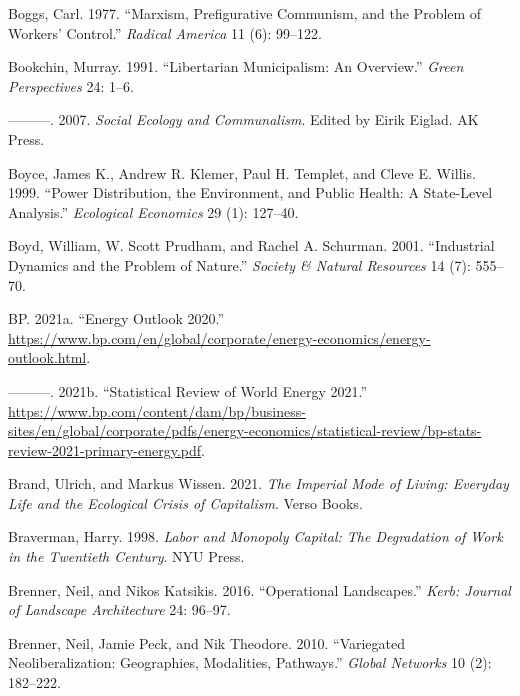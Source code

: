 \documentclass[a4paper, nobind]{templates/ociamthesis}
\newlength{\cslhangindent}
\newenvironment{CSLReferences}[2] %
 {%
  \setlength{\parindent}{0pt}
  \ifodd #1
  \let\oldpar\par
  \def\par{\hangindent=\cslhangindent\oldpar}
  \fi
  \setlength{\parskip}{1mm}
  \setlength{\baselineskip}{6mm}
 }%
 {}
\begin{document}
\begin{CSLReferences}{1}{0}
\leavevmode{}%
Boggs, Carl. 1977. {``Marxism, Prefigurative Communism, and the Problem of Workers' Control.''} \emph{Radical America} 11 (6): 99--122.

\leavevmode{}%
Bookchin, Murray. 1991. {``Libertarian Municipalism: {An} Overview.''} \emph{Green Perspectives} 24: 1--6.

\leavevmode{}%
---------. 2007. \emph{Social {Ecology} and {Communalism}}. Edited by Eirik Eiglad. {AK Press}.

\leavevmode{}%
Boyce, James K., Andrew R. Klemer, Paul H. Templet, and Cleve E. Willis. 1999. {``Power Distribution, the Environment, and Public Health: {A} State-Level Analysis.''} \emph{Ecological Economics} 29 (1): 127--40.

\leavevmode{}%
Boyd, William, W. Scott Prudham, and Rachel A. Schurman. 2001. {``Industrial Dynamics and the Problem of Nature.''} \emph{Society \& Natural Resources} 14 (7): 555--70.

\leavevmode{}%
BP. 2021a. {``Energy {Outlook} 2020.''} \url{https://www.bp.com/en/global/corporate/energy-economics/energy-outlook.html}.

\leavevmode{}%
---------. 2021b. {``Statistical {Review} of {World Energy} 2021.''} \url{https://www.bp.com/content/dam/bp/business-sites/en/global/corporate/pdfs/energy-economics/statistical-review/bp-stats-review-2021-primary-energy.pdf}.

\leavevmode{}%
Brand, Ulrich, and Markus Wissen. 2021. \emph{The {Imperial Mode} of {Living}: {Everyday Life} and the {Ecological Crisis} of {Capitalism}}. {Verso Books}.

\leavevmode{}%
Braverman, Harry. 1998. \emph{Labor and {Monopoly Capital}: {The Degradation} of {Work} in the {Twentieth Century}}. {NYU Press}.

\leavevmode{}%
Brenner, Neil, and Nikos Katsikis. 2016. {``Operational {Landscapes}.''} \emph{Kerb: Journal of Landscape Architecture} 24: 96--97.

\leavevmode{}%
Brenner, Neil, Jamie Peck, and Nik Theodore. 2010. {``Variegated Neoliberalization: Geographies, Modalities, Pathways.''} \emph{Global Networks} 10 (2): 182--222.


\end{CSLReferences}
\end{document}
